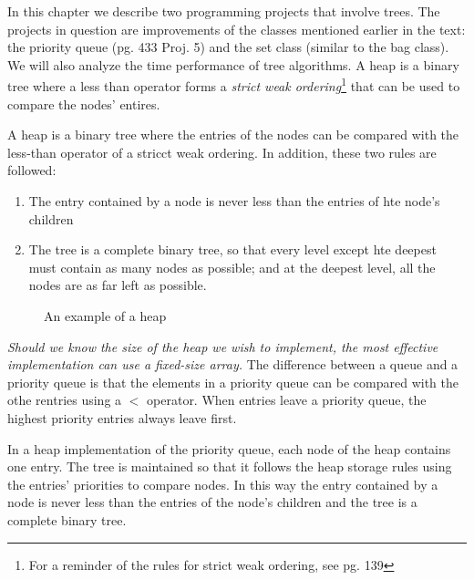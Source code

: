 In this chapter we describe two programming projects that involve trees. The projects in question are improvements of the classes mentioned earlier in the text: the priority queue (pg. 433 Proj. 5) and the set class (similar to the bag class). We will also analyze the time performance of tree algorithms.
A heap is a binary tree where a less than operator forms a \emph{strict weak ordering}\footnote{For a reminder of the rules for strict weak ordering, see pg. 139} that can be used to compare the nodes' entires.

A heap is a binary tree where the entries of the nodes can be compared with the less-than operator of a stricct weak ordering. In addition, these two rules are followed:
\begin{enumerate}
\item The entry contained by a node is never less than the entries of hte node's children
\item The tree is a complete binary tree, so that every level except hte deepest must contain as many nodes as possible; and at the deepest level, all the nodes are as far left as possible.
\end{enumerate}
\begin{figure}[h]
\centering
{}
\caption{An example of a heap}
\end{figure}
\emph{Should we know the size of the heap we wish to implement, the most effective implementation can use a fixed-size array.}
The difference between a queue and a priority queue is that the elements in a priority queue can be compared with the othe rentries using a $<$ operator. When entries leave a priority queue, the highest priority entries always leave first.

In a heap implementation of the priority queue, each node of the heap contains one entry. The tree is maintained so that it follows the heap storage rules using the entries' priorities to compare nodes. In this way the entry contained by a node is never less than the entries of the node's children and the tree is a complete binary tree.

